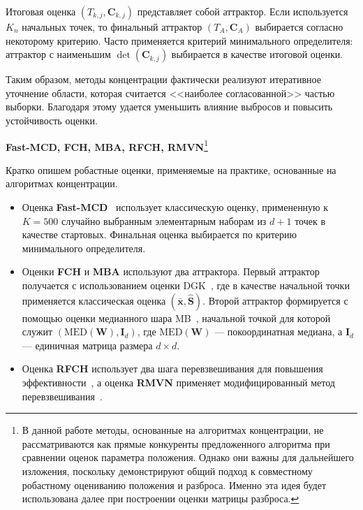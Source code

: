 Итоговая оценка $(T_{k,j}, \mathbf{C}_{k,j})$ представляет собой аттрактор. Если используется $K_n$ начальных точек, то финальный аттрактор $(T_A, \mathbf{C}_A)$ выбирается согласно некоторому критерию. Часто применяется критерий минимального определителя: аттрактор с наименьшим $\det(\mathbf{C}_{k,j})$ выбирается в качестве итоговой оценки.

Таким образом, методы концентрации фактически реализуют итеративное уточнение области, которая считается <<наиболее согласованной>> частью выборки. Благодаря этому удается уменьшить влияние выбросов и повысить устойчивость оценки.

\newpage

\textbf{Fast-MCD, FCH, MBA, RFCH, RMVN}\footnote{В данной работе методы, основанные на алгоритмах концентрации, не рассматриваются как прямые конкуренты предложенного алгоритма при сравнении оценок параметра положения. Однако они важны для дальнейшего изложения, поскольку демонстрируют общий подход к совместному робастному оцениванию положения и разброса. Именно эта идея будет использована далее при построении оценки матрицы разброса.}

Кратко опишем робастные оценки, применяемые на практике, основанные  на алгоритмах концентрации.

\begin{itemize}
    \item Оценка \textbf{Fast-MCD}~\cite{hubert2008high}  использует классическую оценку, примененную к $K = 500$ случайно выбранным элементарным наборам из $d+1$ точек в качестве стартовых. Финальная оценка выбирается по критерию минимального определителя.

    \item  Оценки \textbf{FCH} и \textbf{MBA} используют два аттрактора. Первый аттрактор получается с использованием оценки DGK~\cite{devlin1981robust}, где в качестве начальной точки применяется классическая оценка $(\bar{\mathbf{x}}, \widehat{\mathbf{S}})$. Второй аттрактор формируется с помощью оценки медианного шара MB~\cite{olive2004resistant}, начальной точкой для которой служит $(\text{MED}(\textbf{W}), \textbf{I}_d)$, где $\text{MED}(\textbf{W})$ --- покоординатная медиана, а $\textbf{I}_d$ --- единичная матрица размера $d \times d$.

    \item  Оценка \textbf{RFCH} использует два шага перевзвешивания для повышения эффективности~\cite{olive2010robust}, а оценка \textbf{RMVN} применяет модифицированный метод перевзвешивания~\cite{olive2010robust}.
\end{itemize} 
